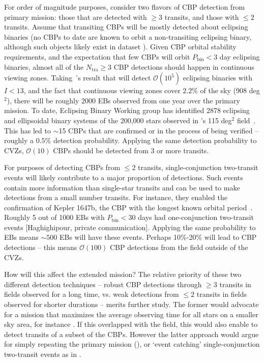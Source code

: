 \begin{enumerate}
	For order of magnitude purposes, consider two flavors of CBP detection from \tesss primary mission: those that are detected with $\ge3$ transits, and those with $\le 2$ transits.
	Assume that transiting CBPs will be mostly detected about eclipsing binaries (no CBPs to date are known to orbit a non-transiting eclipsing binary, although such objects likely exist in \keplers dataset \citep{martin_nontransiting_2014}).
	Given CBP orbital stability requirements, and the expectation that few CBPs will orbit $P_\mathrm{bin} < 3$ day eclipsing binaries, almost all of the $N_\mathrm{tra}\ge3$ CBP detections should happen in \tesss continuous viewing zones.
	Taking~'s result that \tess will detect $\mathcal{O}(10^5)$ eclipsing binaries with $I<13$, and the fact that \tesss continuous viewing zones cover $2.2\%$ of the sky (908 deg$^2$), there will be roughly $2000$ EBs observed from one year over the primary mission.
	To date, \keplers Eclipsing Binary Working group has identified 2878 eclipsing and ellipsoidal binary systems of the 200,000 stars observed in \kepler\!'s 115 deg$^2$ field~\citep{kirk_keplerEB_2016}.
	This has led to $\sim$15 CBPs that are confirmed or in the process of being verified -- roughly a $0.5\%$ detection probability.
	Applying the same detection probability to \tesss CVZs, $\mathcal{O}(10)$ CBPs should be detected from 3 or more transits.
	
	For purposes of detecting CBPs from $\le 2$ transits, single-conjunction two-transit events will likely contribute to a major proportion of \tesss detections.
	Such events contain more information than single-star transits and can be used to make detections from a small number transits. 
	For instance, they enabled the confirmation of Kepler 1647b, the CBP with the longest known orbital period~\citep{kostov_kep1647b_2015}.
	Roughly 5 out of 1000 \kepler EBs with $P_\mathrm{bin}<30$ days had one-conjunction two-transit events [Haghighipour, private communication].
	Applying the same probability to \tess EBs means $\sim500$ \tess EBs will have these events.
	Perhaps 10\%-20\% will lead to CBP detections -- this means $\mathcal{O}(100)$ CBP detections from the \tess field outside of the CVZs.
	
	How will this affect the extended mission?
	The relative priority of these two different detection techniques -- robust CBP detections through $\ge 3$ transits in fields observed for a long time, vs. weak detections from $\le 2$ transits in fields observed for shorter durations -- merits further study.
	The former would advocate for a mission that maximizes the average observing time for all stars on a smaller sky area, for instance \npole.
	If this overlapped with the \kepler field, this would also enable \tess to detect transits of a subset of the \kepler CBPs.
	However the latter approach would argue for simply repeating the primary mission (\nhemi), or `event catching' single-conjunction two-transit events as in \hemis.
	

\end{enumerate}

